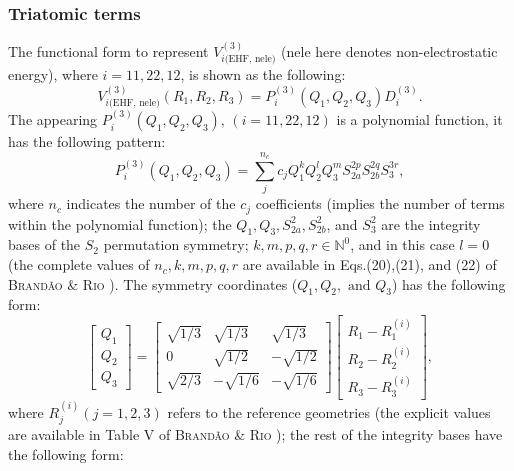 \documentclass[12pt]{article}
\begin{document}
\subsubsection{Triatomic terms}
\label{subsubtriatomic}
The functional form to represent $V^{(3)}_{i\text{(EHF, nele)}}$ (nele here denotes non-electrostatic energy), where $i=11,22,12$, is shown as the following:
\begin{equation}
    V^{(3)}_{i\text{(EHF, nele)}}(R_1, R_2, R_3) = P_i^{(3)}(Q_1, Q_2, Q_3)D_i^{(3)}.
\end{equation}
The appearing $P_i^{(3)}(Q_1, Q_2, Q_3)$, $(i=11,22,12)$ is a polynomial function, it has the following pattern:
\begin{equation}
    P_i^{(3)}(Q_1, Q_2, Q_3) = \sum^{n_c}_{j}c_jQ^k_1Q^l_2Q^m_3S^{2p}_{2a}S^{2q}_{2b}S^{3r}_{3},
    \label{eqehfpoly}
\end{equation}
where $n_c$ indicates the number of the $c_j$ coefficients (implies the number of terms within the polynomial function); the $Q_1, Q_3, S^2_{2a}, S^2_{2b}$, and $S^2_{3}$ are the integrity bases of the $S_2$ permutation symmetry; $k,m,p,q,r \in \mathbb{N}^0$, and in this case $l = 0$ (the complete values of $n_c,k,m,p,q,r$ are available in Eqs.(20),(21), and (22) of \textsc{Brandão \& Rio} \cite{idx41}). The symmetry coordinates ($Q_1, Q_2,\text{ and }Q_3$) has the following form:  
\begin{equation}
    \begin{bmatrix}
        Q_1 \\
        Q_2 \\
        Q_3
    \end{bmatrix}
    =
    \begin{bmatrix}
        \sqrt{1/3} & \sqrt{1/3} & \sqrt{1/3} \\
        0 & \sqrt{1/2} & -\sqrt{1/2} \\
        \sqrt{2/3} & -\sqrt{1/6} & -\sqrt{1/6}
    \end{bmatrix}
    \begin{bmatrix}
        R_1 - R_1^{(i)} \\
        R_2 - R_2^{(i)} \\
        R_3 - R_3^{(i)}
    \end{bmatrix}
    ,
    \label{eqehfsymcoor}
\end{equation}
where $R_j^{(i)} (j=1,2,3)$ refers to the reference geometries (the explicit values are available in Table V of \textsc{Brandão \& Rio} \cite{idx41}); the rest of the integrity bases have the following form:
\end{document}
